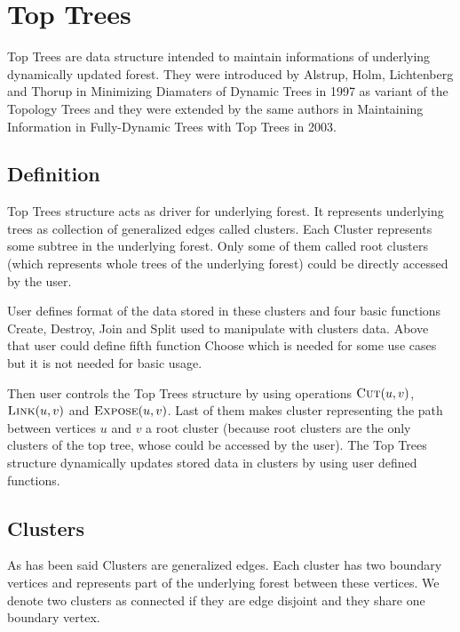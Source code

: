 \chapter{Top Trees}
\label{chap:TopTrees}

Top Trees are data structure intended to maintain informations of underlying
dynamically updated forest. They were introduced by Alstrup, Holm, Lichtenberg
and Thorup in {\I Minimizing Diamaters of Dynamic Trees}
\cite{MinimizingDiamatersOfDynamicTrees} in 1997 as variant of the Topology
Trees and they were extended by the same authors in
{\I Maintaining Information in Fully-Dynamic Trees with Top Trees} \cite{TopTrees} in 2003.

\section{Definition}

{\I Top Trees structure} acts as driver for underlying forest. It represents
underlying trees as collection of generalized edges called {\I clusters}. Each
{\I Cluster} represents some subtree in the underlying forest. Only
some of them called {\I root clusters} (which represents whole trees of the
underlying forest) could be directly accessed by the user.

User defines format of the data stored in these clusters and four basic
functions {\sc Create}, {\sc Destroy}, {\sc Join} and {\sc Split} used to
manipulate with clusters data. Above that user could define fifth function
{\sc Choose} which is needed for some use cases but it is not needed for basic
usage.

Then user controls the Top Trees structure by using operations $\hbox{\sc Cut}(u,v)$,
$\hbox{\sc Link}(u,v)$ and $\hbox{\sc Expose}(u,v)$. Last of them
makes cluster representing the path between vertices $u$ and $v$ a root cluster
(because root clusters are the only clusters of the top tree, whose could be
accessed by the user). The Top Trees structure dynamically updates stored data
in clusters by using user defined functions.




\section{Clusters}

As has been said {\I Clusters} are generalized edges. Each cluster has two
{\I boundary vertices} and represents part of the underlying forest between
these vertices. We denote two clusters as {\I connected} if they are edge
disjoint and they share one boundary vertex.

